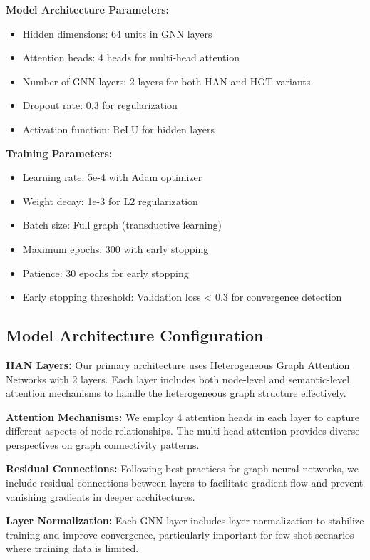 \textbf{Model Architecture Parameters:}
\begin{itemize}
\item Hidden dimensions: 64 units in GNN layers  
\item Attention heads: 4 heads for multi-head attention
\item Number of GNN layers: 2 layers for both HAN and HGT variants
\item Dropout rate: 0.3 for regularization
\item Activation function: ReLU for hidden layers
\end{itemize}

\textbf{Training Parameters:}
\begin{itemize}
\item Learning rate: 5e-4 with Adam optimizer
\item Weight decay: 1e-3 for L2 regularization  
\item Batch size: Full graph (transductive learning)
\item Maximum epochs: 300 with early stopping
\item Patience: 30 epochs for early stopping
\item Early stopping threshold: Validation loss < 0.3 for convergence detection
\end{itemize}

\subsection{Model Architecture Configuration}

\textbf{HAN Layers:} Our primary architecture uses Heterogeneous Graph Attention Networks with 2 layers. Each layer includes both node-level and semantic-level attention mechanisms to handle the heterogeneous graph structure effectively.

\textbf{Attention Mechanisms:} We employ 4 attention heads in each layer to capture different aspects of node relationships. The multi-head attention provides diverse perspectives on graph connectivity patterns.

\textbf{Residual Connections:} Following best practices for graph neural networks, we include residual connections between layers to facilitate gradient flow and prevent vanishing gradients in deeper architectures.

\textbf{Layer Normalization:} Each GNN layer includes layer normalization to stabilize training and improve convergence, particularly important for few-shot scenarios where training data is limited.


